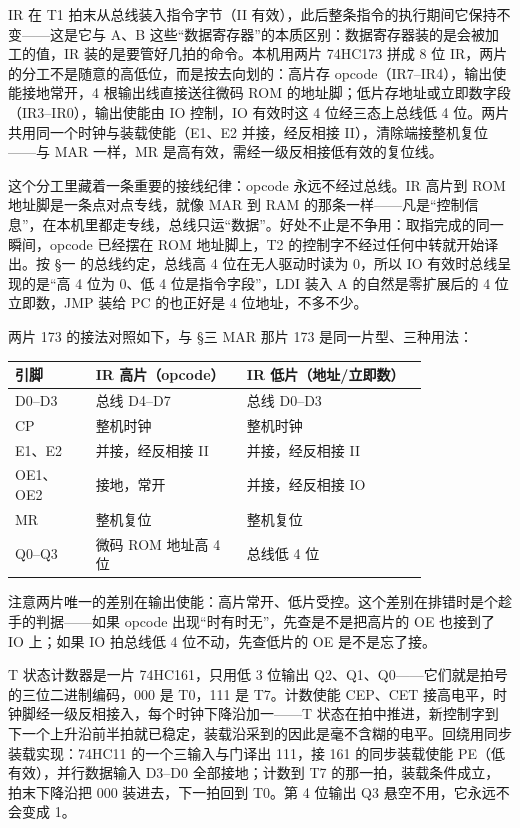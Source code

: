IR 在 T1 拍末从总线装入指令字节（II 有效），此后整条指令的执行期间它保持不变——这是它与 A、B 这些“数据寄存器”的本质区别：数据寄存器装的是会被加工的值，IR 装的是要管好几拍的命令。本机用两片 74HC173 拼成 8 位 IR，两片的分工不是随意的高低位，而是按去向划的：高片存 opcode（IR7–IR4），输出使能接地常开，4 根输出线直接送往微码 ROM 的地址脚；低片存地址或立即数字段（IR3–IR0），输出使能由 IO 控制，IO 有效时这 4 位经三态上总线低 4 位。两片共用同一个时钟与装载使能（E1、E2 并接，经反相接 II），清除端接整机复位——与 MAR 一样，MR 是高有效，需经一级反相接低有效的复位线。

这个分工里藏着一条重要的接线纪律：opcode 永远不经过总线。IR 高片到 ROM 地址脚是一条点对点专线，就像 MAR 到 RAM 的那条一样——凡是“控制信息”，在本机里都走专线，总线只运“数据”。好处不止是不争用：取指完成的同一瞬间，opcode 已经摆在 ROM 地址脚上，T2 的控制字不经过任何中转就开始译出。按 §一 的总线约定，总线高 4 位在无人驱动时读为 0，所以 IO 有效时总线呈现的是“高 4 位为 0、低 4 位是指令字段”，LDI 装入 A 的自然是零扩展后的 4 位立即数，JMP 装给 PC 的也正好是 4 位地址，不多不少。

两片 173 的接法对照如下，与 §三 MAR 那片 173 是同一片型、三种用法：

\begin{longtable}{L{0.16\linewidth}L{0.30\linewidth}L{0.36\linewidth}}
\toprule
引脚 & IR 高片（opcode） & IR 低片（地址/立即数） \\
\midrule
D0–D3 & 总线 D4–D7 & 总线 D0–D3 \\
CP & 整机时钟 & 整机时钟 \\
E1、E2 & 并接，经反相接 II & 并接，经反相接 II \\
OE1、OE2 & 接地，常开 & 并接，经反相接 IO \\
MR & 整机复位 & 整机复位 \\
Q0–Q3 & 微码 ROM 地址高 4 位 & 总线低 4 位 \\
\bottomrule
\end{longtable}

注意两片唯一的差别在输出使能：高片常开、低片受控。这个差别在排错时是个趁手的判据——如果 opcode 出现“时有时无”，先查是不是把高片的 OE 也接到了 IO 上；如果 IO 拍总线低 4 位不动，先查低片的 OE 是不是忘了接。

T 状态计数器是一片 74HC161，只用低 3 位输出 Q2、Q1、Q0——它们就是拍号的三位二进制编码，000 是 T0，111 是 T7。计数使能 CEP、CET 接高电平，时钟脚经一级反相接入，每个时钟下降沿加一——T 状态在拍中推进，新控制字到下一个上升沿前半拍就已稳定，装载沿采到的因此是毫不含糊的电平。回绕用同步装载实现：74HC11 的一个三输入与门译出 111，接 161 的同步装载使能 PE（低有效），并行数据输入 D3–D0 全部接地；计数到 T7 的那一拍，装载条件成立，拍末下降沿把 000 装进去，下一拍回到 T0。第 4 位输出 Q3 悬空不用，它永远不会变成 1。

